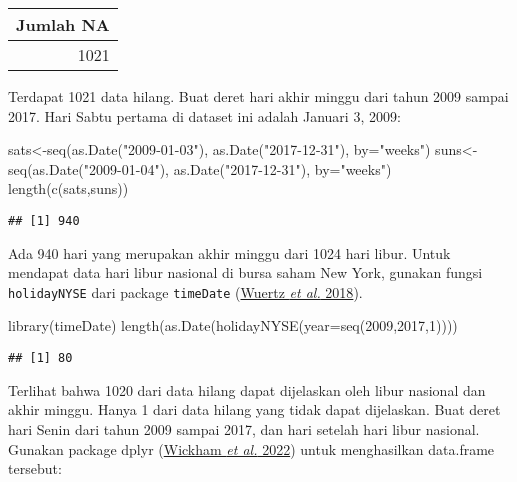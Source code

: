 \documentclass[
]{book}
\newenvironment{Shaded}{\begin{snugshade}}{\end{snugshade}}
\newcommand{\AttributeTok}[1]{\textcolor[rgb]{0.77,0.63,0.00}{#1}}
\newcommand{\DecValTok}[1]{\textcolor[rgb]{0.00,0.00,0.81}{#1}}
\newcommand{\FunctionTok}[1]{\textcolor[rgb]{0.00,0.00,0.00}{#1}}
\newcommand{\NormalTok}[1]{#1}
\newcommand{\OtherTok}[1]{\textcolor[rgb]{0.56,0.35,0.01}{#1}}
\newcommand{\StringTok}[1]{\textcolor[rgb]{0.31,0.60,0.02}{#1}}
\begin{document}
\begin{tabular}{r}
\hline
Jumlah NA\\
\hline
1021\\
\hline
\end{tabular}

Terdapat 1021 data hilang. Buat deret hari akhir minggu dari tahun 2009 sampai 2017. Hari Sabtu pertama di dataset ini adalah Januari 3, 2009:

\begin{Shaded}
\begin{Highlighting}[]
\NormalTok{sats}\OtherTok{\textless{}{-}}\FunctionTok{seq}\NormalTok{(}\FunctionTok{as.Date}\NormalTok{(}\StringTok{"2009{-}01{-}03"}\NormalTok{), }\FunctionTok{as.Date}\NormalTok{(}\StringTok{"2017{-}12{-}31"}\NormalTok{), }\AttributeTok{by=}\StringTok{"weeks"}\NormalTok{)}
\NormalTok{suns}\OtherTok{\textless{}{-}}\FunctionTok{seq}\NormalTok{(}\FunctionTok{as.Date}\NormalTok{(}\StringTok{"2009{-}01{-}04"}\NormalTok{), }\FunctionTok{as.Date}\NormalTok{(}\StringTok{"2017{-}12{-}31"}\NormalTok{), }\AttributeTok{by=}\StringTok{"weeks"}\NormalTok{)}
\FunctionTok{length}\NormalTok{(}\FunctionTok{c}\NormalTok{(sats,suns))}
\end{Highlighting}
\end{Shaded}

\begin{verbatim}
## [1] 940
\end{verbatim}

Ada 940 hari yang merupakan akhir minggu dari 1024 hari libur. Untuk mendapat data hari libur nasional di bursa saham New York, gunakan fungsi \texttt{holidayNYSE} dari package \texttt{timeDate} (\protect\hyperlink{ref-R-timeDate}{Wuertz \emph{et al.} 2018}).

\begin{Shaded}
\begin{Highlighting}[]
\FunctionTok{library}\NormalTok{(timeDate)}
\FunctionTok{length}\NormalTok{(}\FunctionTok{as.Date}\NormalTok{(}\FunctionTok{holidayNYSE}\NormalTok{(}\AttributeTok{year=}\FunctionTok{seq}\NormalTok{(}\DecValTok{2009}\NormalTok{,}\DecValTok{2017}\NormalTok{,}\DecValTok{1}\NormalTok{))))}
\end{Highlighting}
\end{Shaded}

\begin{verbatim}
## [1] 80
\end{verbatim}

Terlihat bahwa 1020 dari data hilang dapat dijelaskan oleh libur nasional dan akhir minggu. Hanya 1 dari data hilang yang tidak dapat dijelaskan. Buat deret hari Senin dari tahun 2009 sampai 2017, dan hari setelah hari libur nasional. Gunakan package dplyr (\protect\hyperlink{ref-R-dplyr}{Wickham \emph{et al.} 2022}) untuk menghasilkan data.frame tersebut:
\end{document}
